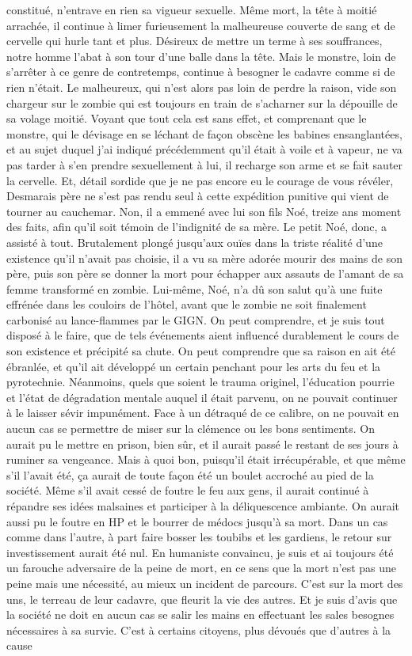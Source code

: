 constitué, n’entrave en rien sa vigueur sexuelle. Même mort, la tête à moitié arrachée, il continue à limer furieusement la malheureuse couverte de sang et de cervelle qui hurle tant et plus. Désireux de mettre un terme à ses souffrances, notre homme l’abat à son tour d’une balle dans la tête. Mais le monstre, loin de s’arrêter à ce genre de contretemps, continue à besogner le cadavre comme si de rien n’était. Le malheureux, qui n’est alors pas loin de perdre la raison, vide son chargeur sur le zombie qui est toujours en train de s’acharner sur la dépouille de sa volage moitié. Voyant que tout cela est sans effet, et comprenant que le monstre, qui le dévisage en se léchant de façon obscène les babines ensanglantées, et au sujet duquel j’ai indiqué précédemment qu’il était à voile et à vapeur, ne va pas tarder à s’en prendre sexuellement à lui, il recharge son arme et se fait sauter la cervelle. Et, détail sordide que je ne pas encore eu le courage de vous révéler, Desmarais père ne s’est pas rendu seul à cette expédition punitive qui vient de tourner au cauchemar. Non, il a emmené avec lui son fils Noé, treize ans moment des faits, afin qu’il soit témoin de l’indignité de sa mère. Le petit Noé, donc, a assisté à tout. Brutalement plongé jusqu’aux ouïes dans la triste réalité d’une existence qu’il n’avait pas choisie, il a vu sa mère adorée mourir des mains de son père, puis son père se donner la mort pour échapper aux assauts de l’amant de sa femme transformé en zombie. Lui-même, Noé, n’a dû son salut qu’à une fuite effrénée dans les couloirs de l’hôtel, avant que le zombie ne soit finalement carbonisé au lance-flammes par le GIGN. On peut comprendre, et je suis tout disposé à le faire, que de tels événements aient influencé durablement le cours de son existence et précipité sa chute. On peut comprendre que sa raison en ait été ébranlée, et qu’il ait développé un certain penchant pour les arts du feu et la pyrotechnie. Néanmoins, quels que soient le trauma originel, l’éducation pourrie et l’état de dégradation mentale auquel il était parvenu, on ne pouvait continuer à le laisser sévir impunément. Face à un détraqué de ce calibre, on ne pouvait en aucun cas se permettre de miser sur la clémence ou les bons sentiments. On aurait pu le mettre en prison, bien sûr, et il aurait passé le restant de ses jours à ruminer sa vengeance. Mais à quoi bon, puisqu’il était irrécupérable, et que même s’il l’avait été, ça aurait de toute façon été un boulet accroché au pied de la société. Même s’il avait cessé de foutre le feu aux gens, il aurait continué à répandre ses idées malsaines et participer à la déliquescence ambiante. On aurait aussi pu le foutre en HP et le bourrer de médocs jusqu’à sa mort. Dans un cas comme dans l’autre, à part faire bosser les toubibs et les gardiens, le retour sur investissement aurait été nul. En humaniste convaincu, je suis et ai toujours été un farouche adversaire de la peine de mort, en ce sens que la mort n’est pas une peine mais une nécessité, au mieux un incident de parcours. C’est sur la mort des uns, le terreau de leur cadavre, que fleurit la vie des autres. Et je suis d’avis que la société ne doit en aucun cas se salir les mains en effectuant les sales besognes nécessaires à sa survie. C’est à certains citoyens, plus dévoués que d’autres à la cause 